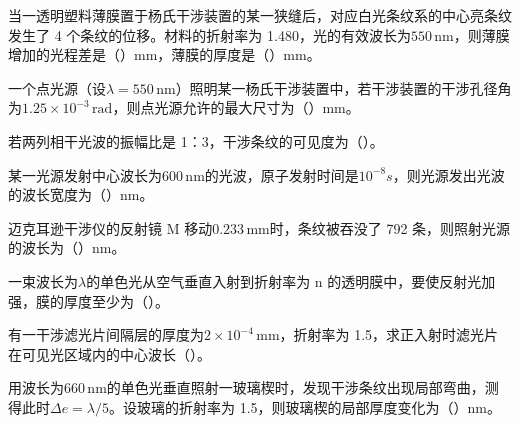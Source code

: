 \documentclass[standard, analysis, notocnum]{ExBook}
\newcommand{\answerarea}[1][8cm]{%
  \par\vspace{2mm}%
  \noindent{\color{themeColor!35}\rule{\linewidth}{0.4pt}}\par
  \noindent\begin{minipage}[t][#1][t]{\linewidth}\vspace{0pt}\end{minipage}\par
  \noindent{\color{themeColor!35}\rule{\linewidth}{0.4pt}}\par
}
\begin{document}
\begin{qitems}
\begin{bbox}
\answerarea[3.5cm]
\end{bbox}
\begin{bbox}
\qitem 当一透明塑料薄膜置于杨氏干涉装置的某一狭缝后，对应白光条纹系的中心亮条纹发生了 4 个条纹的位移。材料的折射率为 1.480，光的有效波长为$550\,\mathrm{nm}$，则薄膜增加的光程差是（\hspace{1.6em}）mm，薄膜的厚度是（\hspace{1.6em}）mm。
\answerarea[3.5cm]
\end{bbox}
\begin{bbox}
\qitem 一个点光源（设$\lambda =550\,\mathrm{nm}$）照明某一杨氏干涉装置中，若干涉装置的干涉孔径角为$1.25\times 10^{-3}\,\mathrm{rad}$，则点光源允许的最大尺寸为（\hspace{1.6em}）mm。
\answerarea[3.5cm]
\end{bbox}
\begin{bbox}
\qitem 若两列相干光波的振幅比是 1：3，干涉条纹的可见度为（\hspace{1.6em}）。
\answerarea[3.5cm]
\end{bbox}
\begin{bbox}
\qitem 某一光源发射中心波长为$600\,\mathrm{nm}$的光波，原子发射时间是$10^{-8}s$，则光源发出光波的波长宽度为（\hspace{1.6em}）nm。
\answerarea[3.5cm]
\end{bbox}
\begin{bbox}
\qitem 迈克耳逊干涉仪的反射镜 M 移动$0.233\,\mathrm{mm}$时，条纹被吞没了 792 条，则照射光源的波长为（\hspace{1.6em}）nm。
\answerarea[3.5cm]
\end{bbox}
\begin{bbox}
\qitem 一束波长为$\lambda$的单色光从空气垂直入射到折射率为 n 的透明膜中，要使反射光加强，膜的厚度至少为（\hspace{1.6em}）。
\answerarea[3.5cm]
\end{bbox}
\begin{bbox}
\qitem 有一干涉滤光片间隔层的厚度为$2\times 10^{-4}\,\mathrm{mm}$，折射率为 1.5，求正入射时滤光片在可见光区域内的中心波长（\hspace{1.6em}）。
\answerarea[3.5cm]
\end{bbox}
\begin{bbox}
\qitem 用波长为$660\,\mathrm{nm}$的单色光垂直照射一玻璃楔时，发现干涉条纹出现局部弯曲，测得此时$\Delta e=\lambda /5$。设玻璃的折射率为 1.5，则玻璃楔的局部厚度变化为（\hspace{1.6em}）nm。
\answerarea[3.5cm]
\end{bbox}

\end{qitems}
\end{document}
